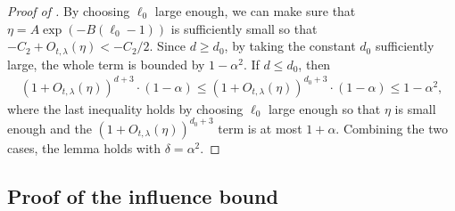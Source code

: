 \documentclass[11pt]{amsart}
\theoremstyle{definition}
\theoremstyle{remark}
\begin{document}
\begin{proof}[Proof of ]
By choosing $\ell_0$ large enough, we can make sure that $\eta = A \exp(-B(\ell_0 - 1))$ is sufficiently small so that $-C_2 + O_{t,\lambda}(\eta) < -C_2/2$. 
Since $d \ge d_0$, by taking the constant $d_0$ sufficiently large, the whole term is bounded by $1 - \alpha^2$. 
If $d \leq d_0$, then
\begin{align*}
     (1+O_{t,\lambda} (\eta))^{d+3} \cdot (1-\alpha) \leq   (1+O_{t,\lambda} (\eta))^{d_0+3} \cdot (1-\alpha) \leq 1 - \alpha^2,
\end{align*}
where the last inequality holds by choosing $\ell_0$ large enough so that $\eta$ is small enough and the $(1+O_{t,\lambda} (\eta))^{d_0+3}$ term is at most $1+\alpha$. Combining the two cases, the lemma holds with $\delta = \alpha^2$.
\end{proof}

\subsection{Proof of the influence bound} \label{subsec:proof-of-the-influence-bound}
\end{document}
